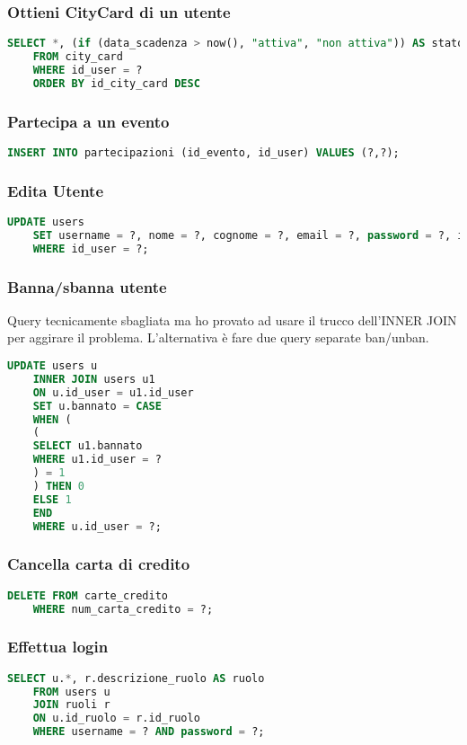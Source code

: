 \subsubsection{Ottieni CityCard di un utente}
\begin{lstlisting}[language=SQL]
	SELECT *, (if (data_scadenza > now(), "attiva", "non attiva")) AS stato
	FROM city_card 
	WHERE id_user = ?
	ORDER BY id_city_card DESC
\end{lstlisting}

\subsubsection{Partecipa a un evento}
\begin{lstlisting}[language=SQL]
	INSERT INTO partecipazioni (id_evento, id_user) VALUES (?,?);
\end{lstlisting}

\subsubsection{Edita Utente}
\begin{lstlisting}[language=SQL]
	UPDATE users 
	SET username = ?, nome = ?, cognome = ?, email = ?, password = ?, indirizzo = ?, telefono = ?, cf = ? 
	WHERE id_user = ?;
\end{lstlisting}

\subsubsection{Banna/sbanna utente}
Query tecnicamente sbagliata ma ho provato ad usare il trucco dell'INNER JOIN per aggirare il problema. L'alternativa è fare due query separate ban/unban.
\begin{lstlisting}[language=SQL]
	UPDATE users u
	INNER JOIN users u1 
	ON u.id_user = u1.id_user
	SET u.bannato = CASE
	WHEN (
	(
	SELECT u1.bannato
	WHERE u1.id_user = ?
	) = 1
	) THEN 0
	ELSE 1
	END
	WHERE u.id_user = ?;
\end{lstlisting}

\subsubsection{Cancella carta di credito}
\begin{lstlisting}[language=SQL]
	DELETE FROM carte_credito
	WHERE num_carta_credito = ?;
\end{lstlisting}

\subsubsection{Effettua login}
\begin{lstlisting}[language=SQL]
	SELECT u.*, r.descrizione_ruolo AS ruolo
	FROM users u
	JOIN ruoli r 
	ON u.id_ruolo = r.id_ruolo
	WHERE username = ? AND password = ?;
\end{lstlisting}

